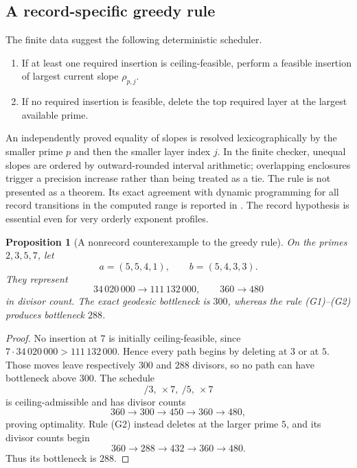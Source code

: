 \documentclass[11pt]{article}
\numberwithin{equation}{section}
\theoremstyle{blueplain}
\newtheorem{proposition}[theorem]{Proposition}
\theoremstyle{bluedef}
\begin{document}
\subsection{A record-specific greedy rule}

The finite data suggest the following deterministic scheduler.
\begin{enumerate}[label=\textup{(G\arabic*)}]
\item If at least one required insertion is ceiling-feasible, perform a feasible insertion of largest current slope $\rho_{p,j}$.
\item If no required insertion is feasible, delete the top required layer at the largest available prime.
\end{enumerate}
An independently proved equality of slopes is resolved lexicographically by the smaller prime $p$ and then the smaller layer index $j$.  In the finite checker, unequal slopes are ordered by outward-rounded interval arithmetic; overlapping enclosures trigger a precision increase rather than being treated as a tie.
The rule is not presented as a theorem.  Its exact agreement with dynamic programming for all record transitions in the computed range is reported in .  The record hypothesis is essential even for very orderly exponent profiles.

\begin{proposition}[A nonrecord counterexample to the greedy rule]
\label{prop:greedy-counterexample}
On the primes $2,3,5,7$, let
\begin{equation}
 a=(5,5,4,1),
 \qquad
 b=(5,4,3,3).
 \label{eq:greedy-counterexample-profiles}
\end{equation}
They represent
\[
 34\,020\,000\longrightarrow111\,132\,000,
 \qquad
 360\longrightarrow480
\]
in divisor count.  The exact geodesic bottleneck is $300$, whereas the rule \textup{(G1)--(G2)} produces bottleneck $288$.
\end{proposition}

\begin{proof}
No insertion at $7$ is initially ceiling-feasible, since
$7\cdot34\,020\,000>111\,132\,000$.  Hence every path begins by deleting at $3$ or at $5$.  Those moves leave respectively $300$ and $288$ divisors, so no path can have bottleneck above $300$.  The schedule
\[
 /3,\ \times7,\ /5,\ \times7
\]
is ceiling-admissible and has divisor counts
\[
 360\to300\to450\to360\to480,
\]
proving optimality.  Rule (G2) instead deletes at the larger prime $5$, and its divisor counts begin
\[
 360\to288\to432\to360\to480.
\]
Thus its bottleneck is $288$.
\end{proof}
\end{document}
